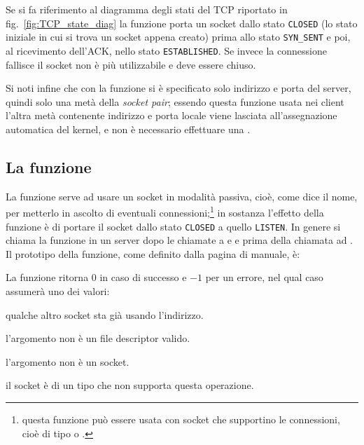 Se si fa riferimento al diagramma degli stati del TCP riportato in
fig.~\ref{fig:TCP_state_diag} la funzione  porta un socket dallo
stato \texttt{CLOSED} (lo stato iniziale in cui si trova un socket appena
creato) prima allo stato \texttt{SYN\_SENT} e poi, al ricevimento dell'ACK,
nello stato \texttt{ESTABLISHED}. Se invece la connessione fallisce il socket
non è più utilizzabile e deve essere chiuso.

Si noti infine che con la funzione  si è specificato solo
indirizzo e porta del server, quindi solo una metà della \textit{socket pair};
essendo questa funzione usata nei client l'altra metà contenente indirizzo e
porta locale viene lasciata all'assegnazione automatica del kernel, e non è
necessario effettuare una .


\subsection{La funzione }
\label{sec:TCP_func_listen}

La funzione  serve ad usare un socket in modalità passiva, cioè,
come dice il nome, per metterlo in ascolto di eventuali
connessioni;\footnote{questa funzione può essere usata con socket che
  supportino le connessioni, cioè di tipo  o
  .} in sostanza l'effetto della funzione è di portare
il socket dallo stato \texttt{CLOSED} a quello \texttt{LISTEN}. In genere si
chiama la funzione in un server dopo le chiamate a  e 
e prima della chiamata ad . Il prototipo della funzione, come
definito dalla pagina di manuale, è:

\begin{funcproto}{
}

{La funzione ritorna $0$ in caso di successo e $-1$ per un errore, nel qual
  caso  assumerà uno dei valori: 
  \begin{errlist}
  \item[\errcode{EADDRINUSE}] qualche altro socket sta già usando l'indirizzo.
  \item[\errcode{EBADF}] l'argomento  non è un file descriptor
    valido.
  \item[\errcode{ENOTSOCK}] l'argomento  non è un socket.
  \item[\errcode{EOPNOTSUPP}] il socket è di un tipo che non supporta questa
    operazione.
  \end{errlist}
}
\end{funcproto}

